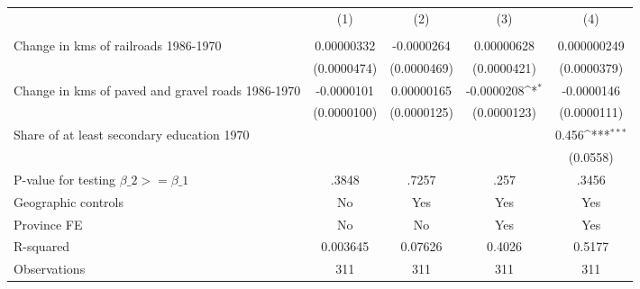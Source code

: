 {
\def\sym#1{\ifmmode^{#1}\else\(^{#1}\)\fi}
\begin{tabular}{l*{4}{c}}
\hline\hline
                &\multicolumn{1}{c}{(1)}&\multicolumn{1}{c}{(2)}&\multicolumn{1}{c}{(3)}&\multicolumn{1}{c}{(4)}\\
                &\multicolumn{1}{c}{}&\multicolumn{1}{c}{}&\multicolumn{1}{c}{}&\multicolumn{1}{c}{}\\
\hline
Change in kms of railroads 1986-1970&0.00000332         &-0.0000264         &0.00000628         &0.000000249         \\
                &(0.0000474)         &(0.0000469)         &(0.0000421)         &(0.0000379)         \\
[1em]
Change in kms of paved and gravel roads 1986-1970&-0.0000101         &0.00000165         &-0.0000208\sym{*}  &-0.0000146         \\
                &(0.0000100)         &(0.0000125)         &(0.0000123)         &(0.0000111)         \\
[1em]
Share of at least secondary education 1970&                  &                  &                  &    0.456\sym{***}\\
                &                  &                  &                  & (0.0558)         \\
\hline
P-value for testing $\beta\_{2} >= \beta\_{1}$&    .3848         &    .7257         &     .257         &    .3456         \\
Geographic controls&       No         &      Yes         &      Yes         &      Yes         \\
Province FE     &       No         &       No         &      Yes         &      Yes         \\
R-squared       & 0.003645         &  0.07626         &   0.4026         &   0.5177         \\
Observations    &      311         &      311         &      311         &      311         \\
\hline\hline
\end{tabular}
}
